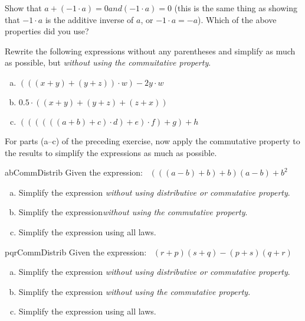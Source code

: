 \begin{exercise}{}
Show that $a + (-1 \cdot a) = 0 and (-1 \cdot a)=0$  (this is the same thing as showing that  $-1 \cdot a$ is the additive inverse of $a$, or $-1 \cdot a = -a$).  Which of the above properties did you use?
\end{exercise}

\begin{exercise}{}
Rewrite the following expressions without any parentheses and simplify as much as possible, but \emph{without using the commuitative property}.
\begin{enumerate}[(a)]
\item
$(((x + y) + (y+z))\cdot w) - 2y \cdot w$
\item
$0.5 \cdot ( (x+y) + (y + z) + (z + x))$
\item
$((((((a+b)+c) \cdot d)+ e) \cdot f) + g) + h$
\end{enumerate}
\end{exercise}

\begin{exercise}{}
For parts (a--c) of the preceding exercise, now apply the commutative property to the results to simplify the expressions as much as possible.
\end{exercise}

\begin{exercise}{abCommDistrib}
Given the expression:~
 $(((a-b)+b)+b)(a-b) + b^2$
\begin{enumerate}[(a)]
\item
Simplify the expression \emph{without using distributive or commutative property}.
\item
Simplify the expression\emph{without using the commutative property}.
\item
Simplify the expression using all laws.
\end{enumerate}
\end{exercise}

\begin{exercise}{pqrCommDistrib}
Given the expression:~
 $(r+p)(s+q) - (p+s)(q+r)$
\begin{enumerate}[(a)]
\item
Simplify the expression \emph{without using distributive or commutative property}.
\item
Simplify the expression \emph{without using the commutative property}.
\item
Simplify the expression using all laws.
\end{enumerate}
\end{exercise}

